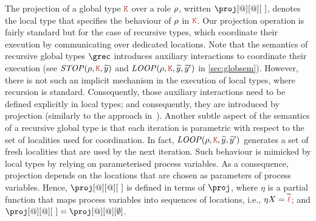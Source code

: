 The projection of a global type $\aK$ over a role $\rho$, 
written $\proj[@][@][\ ]$,  denotes the local type that specifies 
the behaviour of  $\rho$ in $\aK$. 
% 
Our projection operation is fairly standard but for the case of
recursive types, which coordinate their execution by communicating
over dedicated locations.
%
%
Note that the semantics of recursive global types $\grec$ introduces
auxiliary interactions to coordinate their execution (see
$\mathit{STOP}(\arole, \aK, \seq y)$ and
$\mathit{LOOP}(\arole, \aK, \seq y, \seq y')$ in \cref{sec:globsem}).
%
However, there is not such an implicit mechanism in the 
execution of local types, where recursion is standard. 
%
Consequently, those auxiliary interactions need to be defined
explicitly in local types; and consequently, they are introduced by
projection (similarly to the approach in~\cite{bmt14}).
%
Another subtle aspect of the semantics of a recursive global type is that 
each iteration  is parametric with respect to the set of localities used 
for coordination. In fact,  $\mathit{LOOP}(\arole, \aK, \seq y, \seq y')$
generates a set of fresh localities  that are 
used by the next iteration. Such behaviour is mimicked by local types by 
relying on parameterised process variables. As a consequence,
projection depends on the locations that are chosen as parameters  
of process variables. Hence, $\proj[@][@][\ ]$ is defined in terms 
of $\proj$, where $\eta$ is a partial function that maps 
process variables into sequences of locations, i.e., 
$\eta X = \widetilde{{\color{red}\ell}}$; and $\proj[@][@][\ ] = \proj[@][@][\emptyset]$.
